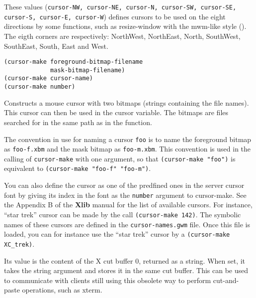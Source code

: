 

These values ({\tt cursor-NW, cursor-NE, cursor-N, cursor-SW, cursor-SE,
cursor-S, cursor-E, cursor-W}) defines cursors to be used on the eight
directions by some functions, such as resize-window with the mwm-like style
(). The eigth corners are respectively: NorthWest,
NorthEast, North, SouthWest, SouthEast, South, East and West.

        
{\usagefont\begin{verbatim}
(cursor-make foreground-bitmap-filename 
             mask-bitmap-filename)
(cursor-make cursor-name)
(cursor-make number)
\end{verbatim}}\usageupspace

Constructs a mouse cursor with two bitmaps (strings containing the file
names). This cursor can then be used in the cursor variable. The bitmaps are
files searched for in the same path as in the  function.

\sloppy The convention in use for naming a cursor \verb"foo" is to name the
foreground bitmap as \verb"foo-f.xbm" and the mask bitmap as
\verb"foo-m.xbm". This convention is used in the calling of
\verb"cursor-make" with one argument, so that \verb|(cursor-make "foo")| is
equivalent to \verb|(cursor-make "foo-f" "foo-m")|.

You can also define the cursor as one of the predfined ones in the server
cursor font by giving its index in the font as the \verb"number" argument to
cursor-make. See the Appendix B of the {\bf Xlib} manual for the list of
available cursors. For instance, ``star trek'' cursor can be made by the
call \verb"(cursor-make 142)".
The symbolic names of these cursors are defined in the \verb"cursor-names.gwm"
file. Once this file is loaded, you can for instance use the ``star trek''
cursor by a \verb"(cursor-make XC_trek)".

        

Its value is the content of the X cut buffer 0, returned as a string.  When
set, it takes the string argument and stores it in the same cut buffer. This
can be used to communicate with clients still using this obsolete way to
perform cut-and-paste operations, such as xterm. 

